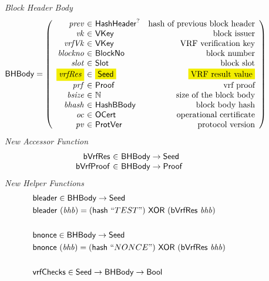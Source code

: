 \begin{figure*}[htb]
  \emph{Block Header Body}
  \begin{equation*}
    \BHBody =
    \left(
      \begin{array}{r@{~\in~}lr}
        \var{prev} & \HashHeader^? & \text{hash of previous block header}\\
        \var{vk} & \VKey & \text{block issuer}\\
        \var{vrfVk} & \VKey & \text{VRF verification key}\\
        \var{blockno} & \BlockNo & \text{block number}\\
        \var{slot} & \Slot & \text{block slot}\\
        \hldiff{\var{vrfRes}} & \hldiff{\Seed} & \hldiff{\text{VRF result value}}\\
        \var{prf} & \Proof & \text{vrf proof}\\
        \var{bsize} & \N & \text{size of the block body}\\
        \var{bhash} & \HashBBody & \text{block body hash}\\
        \var{oc} & \OCert & \text{operational certificate}\\
        \var{pv} & \ProtVer & \text{protocol version}\\
      \end{array}
    \right)
  \end{equation*}
  \emph{New Accessor Function}
  \begin{equation*}
    \begin{array}{r@{~\in~}l}
       \fun{bVrfRes} & \BHBody \to \Seed \\
       \fun{bVrfProof} & \BHBody \to \Proof \\
    \end{array}
  \end{equation*}
  \emph{New Helper Functions}
    \begin{align*}
      & \fun{bleader} \in \BHBody \to \Seed \\
      & \fun{bleader}~(\var{bhb}) = (\fun{hash}~``TEST") ~\XOR~ (\fun{bVrfRes}~\var{bhb})\\
      \\
      & \fun{bnonce} \in \BHBody \to \Seed \\
      & \fun{bnonce}~(\var{bhb}) = (\fun{hash}~``NONCE") ~\XOR~ (\fun{bVrfRes}~\var{bhb})\\
      \\
      & \fun{vrfChecks} \in \Seed \to \BHBody \to \Bool \\

\end{align*}
\end{figure*}
